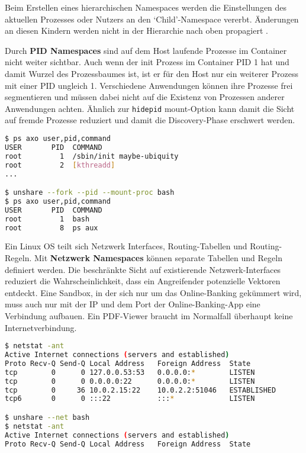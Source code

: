 Beim Erstellen eines hierarchischen Namespaces werden die Einstellungen des aktuellen Prozesses oder Nutzers an den `Child'-Namespace vererbt. Änderungen an diesen Kindern werden nicht in der Hierarchie nach oben propagiert \cite{man-ns-7}. 

Durch \textbf{PID Namespaces} sind auf dem Host laufende Prozesse im Container nicht weiter sichtbar. Auch wenn der init Prozess im Container PID 1 hat und damit Wurzel des Prozessbaumes ist, ist er für den Host nur ein weiterer Prozess mit einer PID ungleich 1. Verschiedene Anwendungen können ihre Prozesse frei segmentieren und müssen dabei nicht auf die Existenz von Prozessen anderer
Anwendungen achten. Ähnlich zur \texttt{hidepid} mount-Option kann damit die Sicht auf fremde Prozesse reduziert und damit die Discovery-Phase erschwert werden.

\begin{lstlisting}[language=sh,caption={Isolation von Prozessen über PID namespaces}]
$ ps axo user,pid,command
USER       PID  COMMAND
root         1  /sbin/init maybe-ubiquity
root         2  [kthreadd]
...

$ unshare --fork --pid --mount-proc bash
$ ps axo user,pid,command
USER       PID  COMMAND
root         1  bash
root         8  ps aux
\end{lstlisting}

Ein Linux OS teilt sich Netzwerk Interfaces, Routing-Tabellen und Routing-Regeln. Mit \textbf{Netzwerk Namespaces} können separate Tabellen und Regeln definiert werden. Die beschränkte Sicht auf existierende Netzwerk-Interfaces reduziert die Wahrscheinlichkeit, dass ein Angreifender potenzielle Vektoren entdeckt. Eine Sandbox, in der sich nur um das Online-Banking gekümmert wird, muss auch nur mit der IP und dem Port der Online-Banking-App eine Verbindung aufbauen. Ein PDF-Viewer
braucht im Normalfall überhaupt keine Internetverbindung.

\begin{lstlisting}[language=sh,basicstyle=\footnotesize\ttfamily,caption={Isolation der aktiven Internetverbindungen durch einen Netzwerk Namespace}]
$ netstat -ant
Active Internet connections (servers and established)
Proto Recv-Q Send-Q Local Address   Foreign Address  State
tcp        0      0 127.0.0.53:53   0.0.0.0:*        LISTEN
tcp        0      0 0.0.0.0:22      0.0.0.0:*        LISTEN
tcp        0     36 10.0.2.15:22    10.0.2.2:51046   ESTABLISHED
tcp6       0      0 :::22           :::*             LISTEN

$ unshare --net bash
$ netstat -ant
Active Internet connections (servers and established)
Proto Recv-Q Send-Q Local Address   Foreign Address  State
\end{lstlisting}


